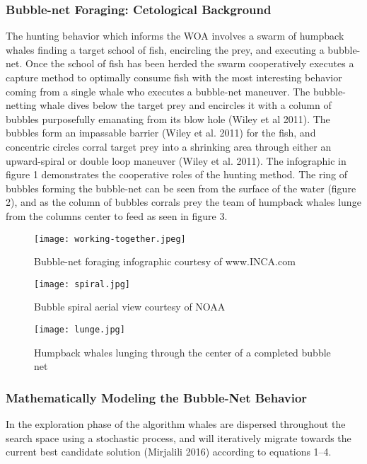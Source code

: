 \documentclass[11pt]{article}
\begin{document}
\subsubsection*{Bubble-net Foraging: Cetological Background}
The hunting behavior which informs the WOA involves a swarm of humpback whales finding a target school of fish, encircling the prey, and executing a bubble-net.
Once the school of fish has been herded the swarm cooperatively executes a capture method to optimally consume fish with the most interesting behavior coming from a single whale who executes a bubble-net maneuver.
The bubble-netting whale dives below the target prey and encircles it with a column of bubbles purposefully emanating from its blow hole (Wiley et al 2011).
The bubbles form an impassable barrier (Wiley et al. 2011) for the fish, and concentric circles corral target prey into a shrinking area through either an upward-spiral or double loop maneuver (Wiley et al. 2011).
The infographic in figure 1 demonstrates the cooperative roles of the hunting method.
The ring of bubbles forming the bubble-net can be seen from the surface of the water (figure 2), and as the column of bubbles corrals prey the team of humpback whales lunge from the columns center to feed as seen in figure 3.

\begin{figure}[h]
	\caption{Bubble-net foraging infographic courtesy of www.INCA.com}
	\texttt{[image: working-together.jpeg]}
\end{figure}

\begin{figure}[h]
	\centering
	\caption{Bubble spiral aerial view courtesy of NOAA}
	\texttt{[image: spiral.jpg]}
\end{figure}

\begin{figure}[h]
	\centering
	\caption{Humpback whales lunging through the center of a completed bubble net}
	\texttt{[image: lunge.jpg]}
\end{figure}

\subsubsection*{Mathematically Modeling the Bubble-Net Behavior}
In the exploration phase of the algorithm whales are dispersed throughout the search space using a stochastic process, and will iteratively migrate towards the current best candidate solution (Mirjalili 2016) according to equations 1--4.
\end{document}
